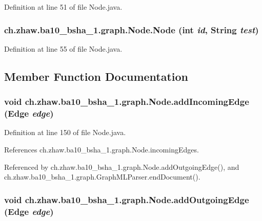Definition at line 51 of file Node.java.\hypertarget{classch_1_1zhaw_1_1ba10__bsha__1_1_1graph_1_1Node_a7842c35883c45ad3b56fcdcfe830e738}{
\subsubsection[{Node}]{\setlength{\rightskip}{0pt plus 5cm}ch.zhaw.ba10\_\-bsha\_\-1.graph.Node.Node (int {\em id}, \/  String {\em test})}}
\label{classch_1_1zhaw_1_1ba10__bsha__1_1_1graph_1_1Node_a7842c35883c45ad3b56fcdcfe830e738}


Definition at line 55 of file Node.java.

\subsection{Member Function Documentation}
\hypertarget{classch_1_1zhaw_1_1ba10__bsha__1_1_1graph_1_1Node_afbf20aec55572fc6c90d2f2541d7eeed}{
\subsubsection[{addIncomingEdge}]{\setlength{\rightskip}{0pt plus 5cm}void ch.zhaw.ba10\_\-bsha\_\-1.graph.Node.addIncomingEdge ({\bf Edge} {\em edge})}}
\label{classch_1_1zhaw_1_1ba10__bsha__1_1_1graph_1_1Node_afbf20aec55572fc6c90d2f2541d7eeed}


Definition at line 150 of file Node.java.

References ch.zhaw.ba10\_\-bsha\_\-1.graph.Node.incomingEdges.

Referenced by ch.zhaw.ba10\_\-bsha\_\-1.graph.Node.addOutgoingEdge(), and ch.zhaw.ba10\_\-bsha\_\-1.graph.GraphMLParser.endDocument().\hypertarget{classch_1_1zhaw_1_1ba10__bsha__1_1_1graph_1_1Node_aeb360f45f8582ea6cda8ef9b6f074df0}{
\subsubsection[{addOutgoingEdge}]{\setlength{\rightskip}{0pt plus 5cm}void ch.zhaw.ba10\_\-bsha\_\-1.graph.Node.addOutgoingEdge ({\bf Edge} {\em edge})}}
\label{classch_1_1zhaw_1_1ba10__bsha__1_1_1graph_1_1Node_aeb360f45f8582ea6cda8ef9b6f074df0}


